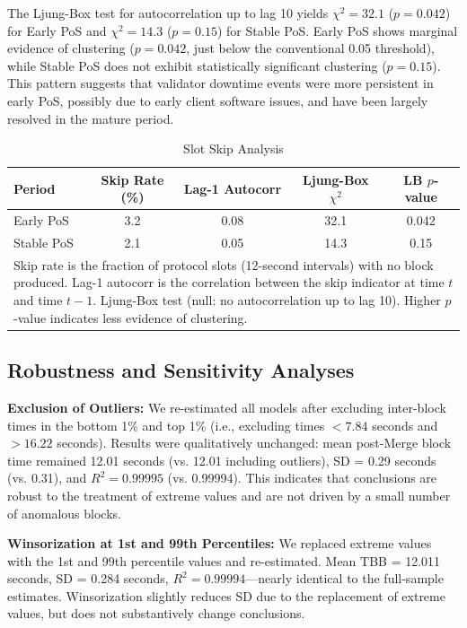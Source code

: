 \documentclass[12pt]{article}
\begin{document}
The Ljung-Box test for autocorrelation up to lag 10 yields $\chi^2 = 32.1$ ($p = 0.042$) for Early PoS and $\chi^2 = 14.3$ ($p = 0.15$) for Stable PoS. Early PoS shows marginal evidence of clustering ($p = 0.042$, just below the conventional 0.05 threshold), while Stable PoS does not exhibit statistically significant clustering ($p = 0.15$). This pattern suggests that validator downtime events were more persistent in early PoS, possibly due to early client software issues, and have been largely resolved in the mature period.

\begin{table}[h]
\centering
\caption{Slot Skip Analysis}
\label{tab:skips}
\begin{tabular}{lcccc}
\toprule
Period & Skip Rate (\%) & Lag-1 Autocorr & Ljung-Box $\chi^2$ & LB $p$-value \\
\midrule
Early PoS & 3.2 & 0.08 & 32.1 & 0.042 \\
Stable PoS & 2.1 & 0.05 & 14.3 & 0.15 \\
\bottomrule
\multicolumn{5}{p{14cm}}{\footnotesize Skip rate is the fraction of protocol slots (12-second intervals) with no block produced. Lag-1 autocorr is the correlation between the skip indicator at time $t$ and time $t-1$. Ljung-Box test (null: no autocorrelation up to lag 10). Higher $p$-value indicates less evidence of clustering.}
\end{tabular}
\end{table}

\subsection{Robustness and Sensitivity Analyses}

\textbf{Exclusion of Outliers:} We re-estimated all models after excluding inter-block times in the bottom 1\% and top 1\% (i.e., excluding times $< 7.84$ seconds and $> 16.22$ seconds). Results were qualitatively unchanged: mean post-Merge block time remained 12.01 seconds (vs. 12.01 including outliers), SD = 0.29 seconds (vs. 0.31), and $R^2 = 0.99995$ (vs. 0.99994). This indicates that conclusions are robust to the treatment of extreme values and are not driven by a small number of anomalous blocks.

\textbf{Winsorization at 1st and 99th Percentiles:} We replaced extreme values with the 1st and 99th percentile values and re-estimated. Mean TBB = 12.011 seconds, SD = 0.284 seconds, $R^2 = 0.99994$—nearly identical to the full-sample estimates. Winsorization slightly reduces SD due to the replacement of extreme values, but does not substantively change conclusions.
\end{document}
